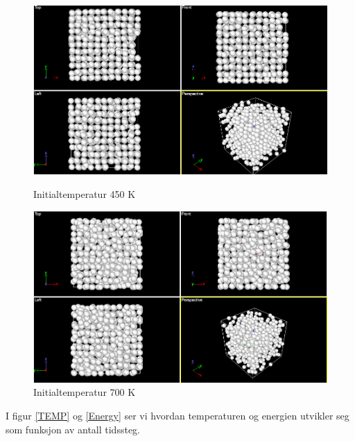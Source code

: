 \documentclass[paper=a4, fontsize=11pt]{scrartcl} %
\numberwithin{equation}{section} %
\numberwithin{figure}{section} %
\numberwithin{table}{section} %
\begin{document}
 \FloatBarrier
\begin{figure}[!htb]
  \includegraphics[width=\linewidth]{T=450}
  \caption{Initialtemperatur 450 K}\label{450}
\endminipage\hfill
{}
  \includegraphics[width=\linewidth]{T=700}
  \caption{Initialtemperatur 700 K}\label{700}
\endminipage\hfill
\end{figure}
 \FloatBarrier

I figur \ref{TEMP} og \ref{Energy} ser vi hvordan temperaturen og energien utvikler seg som funksjon av antall tidssteg. 
\end{document}
